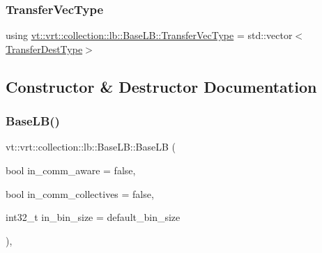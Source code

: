 \mbox{\label{structvt_1_1vrt_1_1collection_1_1lb_1_1_base_l_b_a329e8179ec41a1bd4924c79fe23a79af}} 
\subsubsection{\texorpdfstring{Transfer\+Vec\+Type}{TransferVecType}}
{\footnotesize\ttfamily using \hyperlink{structvt_1_1vrt_1_1collection_1_1lb_1_1_base_l_b_a329e8179ec41a1bd4924c79fe23a79af}{vt\+::vrt\+::collection\+::lb\+::\+Base\+L\+B\+::\+Transfer\+Vec\+Type} =  std\+::vector$<$\hyperlink{structvt_1_1vrt_1_1collection_1_1lb_1_1_base_l_b_add886785f64ea725005f1263fd1393be}{Transfer\+Dest\+Type}$>$}



\subsection{Constructor \& Destructor Documentation}
\mbox{\label{structvt_1_1vrt_1_1collection_1_1lb_1_1_base_l_b_addef25b03975034a0936c515a2942d43}} 
\subsubsection{\texorpdfstring{Base\+L\+B()}{BaseLB()}}
{\footnotesize\ttfamily vt\+::vrt\+::collection\+::lb\+::\+Base\+L\+B\+::\+Base\+LB (\begin{DoxyParamCaption}\item[{bool}]{in\+\_\+comm\+\_\+aware = {\ttfamily false},  }\item[{bool}]{in\+\_\+comm\+\_\+collectives = {\ttfamily false},  }\item[{int32\+\_\+t}]{in\+\_\+bin\+\_\+size = {\ttfamily default\+\_\+bin\+\_\+size} }\end{DoxyParamCaption})\hspace{0.3cm}{\ttfamily [inline]}, {\ttfamily [explicit]}}



